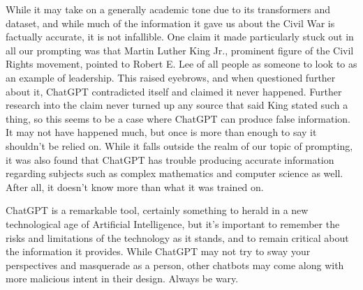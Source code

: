 \documentclass[letterpaper, 10pt, conference]{ieeeconf}
\begin{document}
    While it may take on a generally academic tone due to its transformers and dataset, and while much of the information it gave us about the Civil War is factually accurate, it is not infallible. One claim it made particularly stuck out in all our prompting was that Martin Luther King Jr., prominent figure of the Civil Rights movement, pointed to Robert E. Lee of all people as someone to look to as an example of leadership. This raised eyebrows, and when questioned further about it, ChatGPT contradicted itself and claimed it never happened. Further research into the claim never turned up any source that said King stated such a thing, so this seems to be a case where ChatGPT can produce false information. It may not have happened much, but once is more than enough to say it shouldn’t be relied on. While it falls outside the realm of our topic of prompting, it was also found that ChatGPT has trouble producing accurate information regarding subjects such as complex mathematics and computer science as well. After all, it doesn’t know more than what it was trained on.

    ChatGPT is a remarkable tool, certainly something to herald in a new technological age of Artificial Intelligence, but it’s important to remember the risks and limitations of the technology as it stands, and to remain critical about the information it provides. While ChatGPT may not try to sway your perspectives and masquerade as a person, other chatbots may come along with more malicious intent in their design. Always be wary.

    
    
    \nocite{*}
\end{document}
